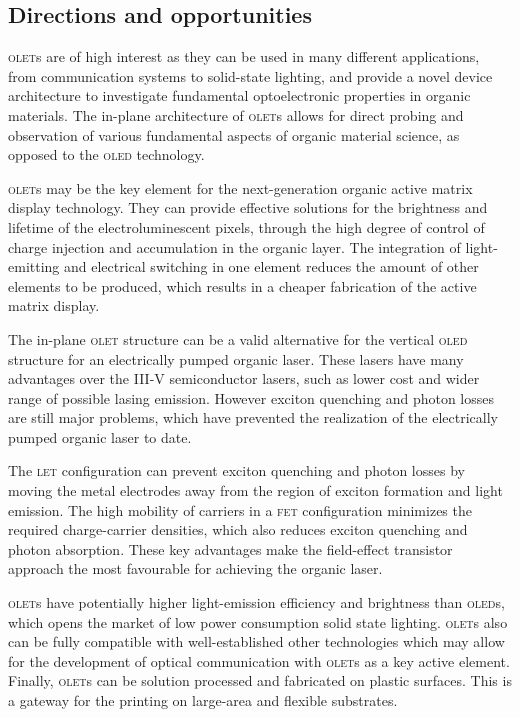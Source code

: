 \subsection{Directions and opportunities} %

\textsc{olet}s are of high interest as they can be used in many different applications, from communication systems to solid-state lighting, and provide a novel device architecture to investigate fundamental optoelectronic properties in organic materials. The in-plane architecture of \textsc{olet}s allows for direct probing and observation of various fundamental aspects of organic material science, as opposed to the \textsc{oled} technology.

\textsc{olet}s may be the key element for the next-generation organic active matrix display technology. They can provide effective solutions for the brightness and lifetime of the electroluminescent pixels, through the high degree of control of charge injection and accumulation in the organic layer. The integration of light-emitting and electrical switching in one element reduces the amount of other elements to be produced, which results in a cheaper fabrication of the active matrix display.

The in-plane \textsc{olet} structure can be a valid alternative for the vertical \textsc{oled} structure for an electrically pumped organic laser. These lasers have many advantages over the III-V semiconductor lasers, such as lower cost and wider range of possible lasing emission. However exciton quenching and photon losses are still major problems, which have prevented the realization of the electrically pumped organic laser to date.

The \textsc{let} configuration can prevent exciton quenching and photon losses by moving the metal electrodes away from the region of exciton formation and light emission. The high mobility of carriers in a \textsc{fet} configuration minimizes the required charge-carrier densities, which also reduces exciton quenching and photon absorption. These key advantages make the field-effect transistor approach the most favourable for achieving the organic laser.

\textsc{olet}s have potentially higher light-emission efficiency and brightness than \textsc{oled}s, which opens the market of low power consumption solid state lighting. \textsc{olet}s also can be fully compatible with well-established other technologies which may allow for the development of optical communication with \textsc{olet}s as a key active element. Finally, \textsc{olet}s can be solution processed and fabricated on plastic surfaces. This is a gateway for the printing on large-area and flexible substrates.
